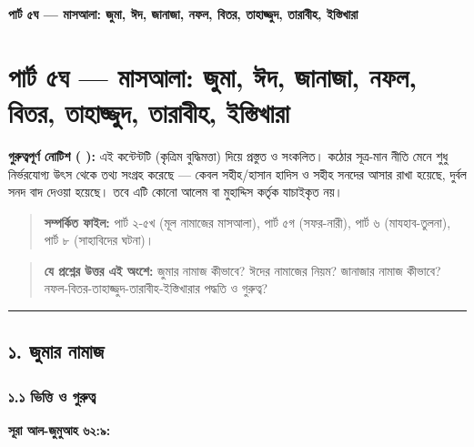 

\begin{center}{\Large\bfseries\color{emerald} পার্ট ৫ঘ — মাসআলা: জুমা, ঈদ, জানাজা, নফল, বিতর, তাহাজ্জুদ, তারাবীহ, ইস্তিখারা}\end{center}
\vspace{1em}
\section*{পার্ট ৫ঘ — মাসআলা: জুমা, ঈদ, জানাজা, নফল, বিতর, তাহাজ্জুদ, তারাবীহ, ইস্তিখারা}

\begin{warnbox}
 \textbf{গুরুত্বপূর্ণ নোটিশ ( ):} এই কন্টেন্টটি  (কৃত্রিম বুদ্ধিমত্তা) দিয়ে প্রস্তুত ও সংকলিত।  কঠোর সূত্র-মান নীতি মেনে শুধু নির্ভরযোগ্য উৎস থেকে তথ্য সংগ্রহ করেছে — কেবল সহীহ/হাসান হাদিস ও সহীহ সনদের আসার রাখা হয়েছে, দুর্বল সনদ বাদ দেওয়া হয়েছে। তবে এটি কোনো আলেম বা মুহাদ্দিস কর্তৃক যাচাইকৃত নয়।
\end{warnbox}

\begin{quote}
\textbf{সম্পর্কিত ফাইল:} পার্ট ২-৫খ (মূল নামাজের মাসআলা), পার্ট ৫গ (সফর-নারী), পার্ট ৬ (মাযহাব-তুলনা), পার্ট ৮ (সাহাবিদের ঘটনা)।
\end{quote}

\begin{quote}
\textbf{যে প্রশ্নের উত্তর এই অংশে:} জুমার নামাজ কীভাবে? ঈদের নামাজের নিয়ম? জানাজার নামাজ কীভাবে? নফল-বিতর-তাহাজ্জুদ-তারাবীহ-ইস্তিখারার পদ্ধতি ও গুরুত্ব?
\end{quote}

\medskip\hrule\medskip

\subsection*{১. জুমার নামাজ}

\subsubsection*{১.১ ভিত্তি ও গুরুত্ব}

\textbf{সূরা আল-জুমুআহ ৬২:৯:}

\begin{center}\end{center}

